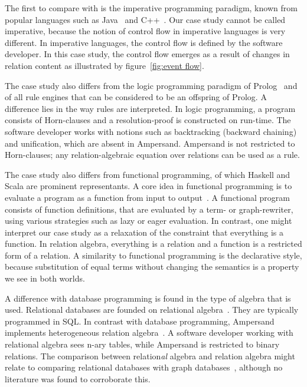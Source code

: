 \documentclass{elsarticle}
\begin{document}
	The first to compare with is the imperative programming paradigm, known from popular languages such as Java~\cite{Java} and C++~\cite{Stroustrup97a}.
	Our case study cannot be called imperative, because the notion of control flow in imperative languages is very different.
	In imperative languages, the control flow is defined by the software developer.
	In this case study, the control flow emerges as a result of changes in relation content as illustrated
	by figure~\ref{fig:event flow}.

	The case study also differs from the logic programming paradigm of Prolog~\cite{Lloyd1984} and of all rule engines that can be considered to be an offspring of Prolog.
	A difference lies in the way rules are interpreted.
	In logic programming, a program consists of Horn-clauses and a resolution-proof is constructed on run-time.
	The software developer works with notions such as backtracking (backward chaining) and unification, which are absent in Ampersand.
	Ampersand is not restricted to Horn-clauses; any relation-algebraic equation over relations can be used as a rule.

	The case study also differs from functional programming, of which Haskell and Scala are prominent representants.
	A core idea in functional programming is to evaluate a program as a function from input to output~\cite{Backus1978}.
	A functional program consists of function definitions, that are evaluated by a term- or graph-rewriter, using various strategies such as lazy or eager evaluation.
	In contrast, one might interpret our case study as a relaxation of the constraint that everything is a function.
	In relation algebra, everything is a relation and a function is a restricted form of a relation.
	A similarity to functional programming is the declarative style, because substitution of equal terms without changing the semantics is a property we see in both worlds.

	A difference with database programming is found in the type of algebra that is used.
	Relational databases are founded on relational algebra~\cite{Codd70}. They are typically programmed in SQL.
	In contrast with database programming, Ampersand implements heterogeneous relation algebra~\cite{Schmidt1997}.
	A software developer working with relational algebra sees n-ary tables, while Ampersand is restricted to binary relations.
	The comparison between relation{\it al} algebra and relation algebra might relate to comparing relational databases with graph databases~\cite{Vicknair2010},
	although no literature was found to corroborate this.
\end{document}
